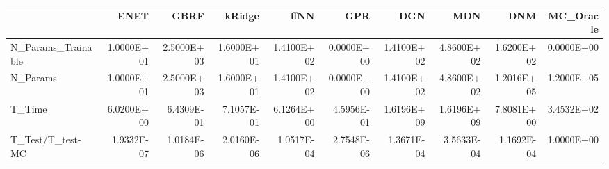 \begin{tabular}{lrrrrrrrrr}
\toprule
{} &       ENET &       GBRF &     kRidge &       ffNN &        GPR &        DGN &        MDN &        DNM &  MC\_Oracle \\
\midrule
N\_Params\_Trainable & 1.0000E+01 & 2.5000E+03 & 1.6000E+01 & 1.4100E+02 & 0.0000E+00 & 1.4100E+02 & 4.8600E+02 & 1.6200E+02 & 0.0000E+00 \\
N\_Params           & 1.0000E+01 & 2.5000E+03 & 1.6000E+01 & 1.4100E+02 & 0.0000E+00 & 1.4100E+02 & 4.8600E+02 & 1.2016E+05 & 1.2000E+05 \\
T\_Time             & 6.0200E+00 & 6.4309E-01 & 7.1057E-01 & 6.1264E+00 & 4.5956E-01 & 1.6196E+09 & 1.6196E+09 & 7.8081E+00 & 3.4532E+02 \\
T\_Test/T\_test-MC   & 1.9332E-07 & 1.0184E-06 & 2.0160E-06 & 1.0517E-04 & 2.7548E-06 & 1.3671E-04 & 3.5633E-04 & 1.1692E-04 & 1.0000E+00 \\
\bottomrule
\end{tabular}

